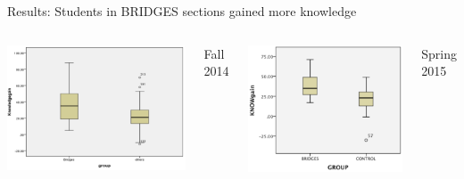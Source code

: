 \documentclass[aspectratio=169]{beamer}
\begin{document}
\begin{frame}{Results: Students in BRIDGES sections gained more knowledge}
  \begin{columns}
    \includegraphics[width=\linewidth]{fig/knowl_gain_f14.png}

    \center Fall 2014

    \includegraphics[width=\linewidth]{fig/knowl_gain_s15.png}

    \center Spring 2015
  \end{columns}
  \end{frame}
\end{document}
